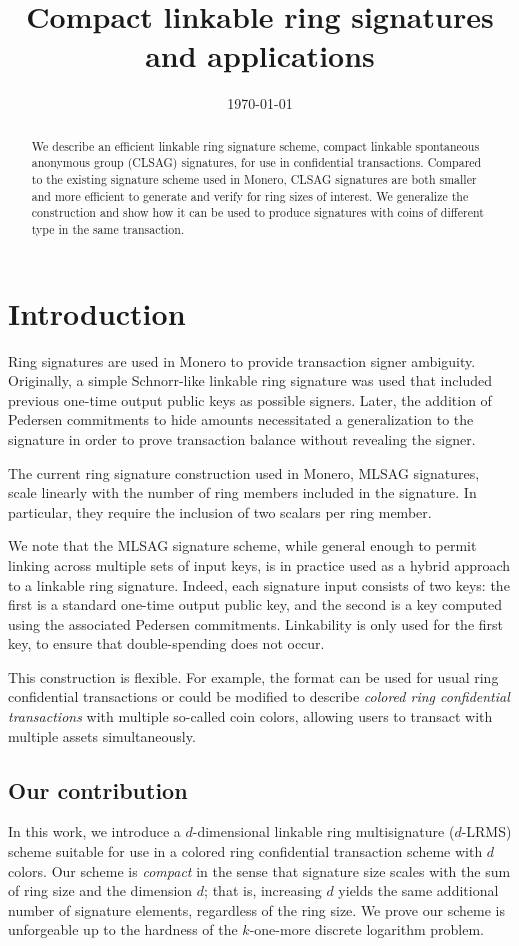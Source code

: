 \documentclass{mrl}
\title{Compact linkable ring signatures and applications}
\date{\today}
\theoremstyle{plain}
\theoremstyle{definition}
\begin{document}
\begin{abstract}
We describe an efficient linkable ring signature scheme, compact linkable spontaneous anonymous group (CLSAG) signatures, for use in confidential transactions. Compared to the existing signature scheme used in Monero, CLSAG signatures are both smaller and more efficient to generate and verify for ring sizes of interest. We generalize the construction and show how it can be used to produce signatures with coins of different type in the same transaction.
\end{abstract}


\section{Introduction}
Ring signatures are used in Monero to provide transaction signer ambiguity. Originally, a simple Schnorr-like linkable ring signature \cite{liu2004linkable} was used that included previous one-time output public keys as possible signers. Later, the addition of Pedersen commitments to hide amounts necessitated a generalization to the signature \cite{noether2016ring} in order to prove transaction balance without revealing the signer.

The current ring signature construction used in Monero, MLSAG signatures, scale linearly with the number of ring members included in the signature. In particular, they require the inclusion of two scalars per ring member.

We note that the MLSAG signature scheme, while general enough to permit linking across multiple sets of input keys, is in practice used as a hybrid approach to a linkable ring signature. Indeed, each signature input consists of two keys: the first is a standard one-time output public key, and the second is a key computed using the associated Pedersen commitments. Linkability is only used for the first key, to ensure that double-spending does not occur.

This construction is flexible. For example, the format can be used for usual ring confidential transactions or could be modified to describe \textit{colored ring confidential transactions} with multiple so-called coin colors, allowing users to transact with multiple assets simultaneously.


\subsection{Our contribution}

In this work, we introduce a $d$-dimensional linkable ring multisignature ($d$-LRMS) scheme suitable for use in a colored ring confidential transaction scheme with $d$ colors. Our scheme is \textit{compact} in the sense that signature size scales with the sum of ring size and the dimension $d$; that is, increasing $d$ yields the same additional number of signature elements, regardless of the ring size. We prove our scheme is unforgeable up to the hardness of the $k$-one-more discrete logarithm problem. 
\end{document}
